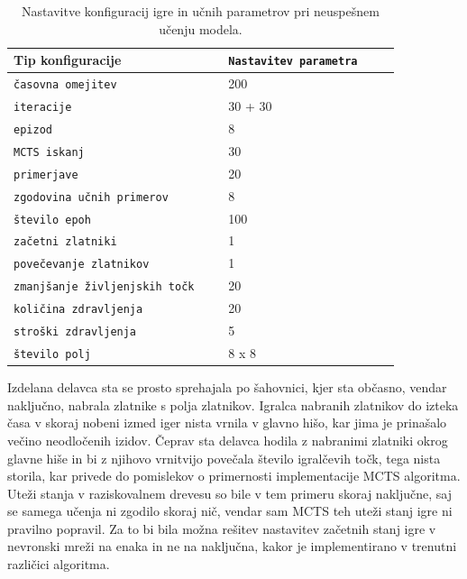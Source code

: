 \documentclass[a4paper, 12pt]{book}
\begin{document}
{\begin{table}
	\begin{center}
		\begin{tabular}{p{0.5\linewidth}|p{0.4\linewidth}}
			Tip konfiguracije                          & {\tt Nastavitev parametra} \\ \hline
			{\tt časovna omejitev}                     & 200                     \\
			{\tt iteracije}                            & 30 + 30                 \\
			{\tt epizod}                               & 8                       \\
			{\tt MCTS iskanj}                          & 30                      \\
			{\tt primerjave}                           & 20                      \\
			{\tt zgodovina učnih primerov}             & 8                       \\
			{\tt število epoh}                         & 100                     \\
			{\tt začetni zlatniki}                     & 1                       \\
			{\tt povečevanje zlatnikov}                & 1                       \\
			{\tt zmanjšanje življenjskih točk}         & 20                      \\
			{\tt količina zdravljenja}                 & 20                      \\
			{\tt stroški zdravljenja}                  & 5                       \\
			{\tt število polj}                         & 8 x 8                   \\
			
		\end{tabular}
	\end{center}
	\caption{Nastavitve konfiguracij igre in učnih parametrov pri neuspešnem učenju modela.}
	\label{tabelLearnConfig}
\end{table}

Izdelana delavca sta se prosto sprehajala po šahovnici, kjer sta občasno, vendar naključno, nabrala zlatnike s polja zlatnikov.
Igralca nabranih zlatnikov do izteka časa v skoraj nobeni izmed iger nista vrnila v glavno hišo, kar jima je prinašalo večino neodločenih izidov.
Čeprav sta delavca hodila z nabranimi zlatniki okrog glavne hiše in bi z njihovo vrnitvijo povečala število igralčevih točk, tega nista storila, kar privede do pomislekov o primernosti implementacije MCTS algoritma.
Uteži stanja v raziskovalnem drevesu so bile v tem primeru skoraj naključne, saj se samega učenja ni zgodilo skoraj nič, vendar sam MCTS teh uteži stanj igre ni pravilno popravil.
Za to bi bila možna rešitev nastavitev začetnih stanj igre v nevronski mreži na enaka in ne na naključna, kakor je implementirano v trenutni različici algoritma.

}
\end{document}
